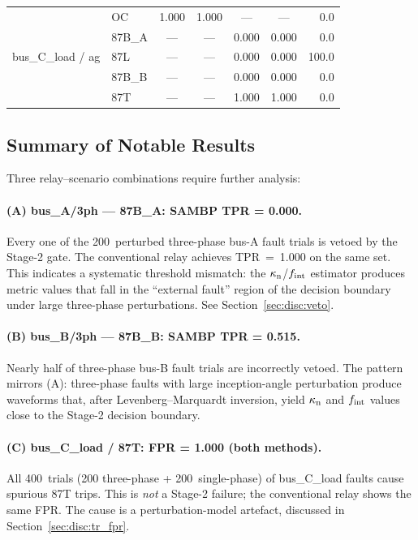 \documentclass[12pt,a4paper]{article}
\newcommand{\kappan}{\kappa_{\rm n}}
\newcommand{\fint}{f_{\rm int}}
\begin{document}
\begin{table}[ht]
\begin{tabular}{llccccr}
\midrule
\multirow{5}{*}{bus\_C\_load / ag}
  & OC      & 1.000 & 1.000 & ---   & ---   & 0.0 \\
  & 87B\_A  & ---   & ---   & 0.000 & 0.000 & 0.0 \\
  & 87L     & ---   & ---   & 0.000 & 0.000 & 100.0 \\
  & 87B\_B  & ---   & ---   & 0.000 & 0.000 & 0.0 \\
  & 87T     & ---   & ---   & \textcolor{warnred}{1.000} & \textcolor{warnred}{1.000} & 0.0 \\
\bottomrule
\end{tabular}
\end{table}

\subsection{Summary of Notable Results}

Three relay--scenario combinations require further analysis:

\paragraph{(A) bus\_A/3ph — 87B\_A: SAMBP TPR = 0.000.}
Every one of the 200~perturbed three-phase bus-A fault trials is vetoed
by the Stage-2 gate.  The conventional relay achieves TPR~=~1.000 on
the same set.  This indicates a systematic threshold mismatch: the
$\kappan$/$\fint$ estimator produces metric values that fall in the
``external fault'' region of the decision boundary under large
three-phase perturbations.  See Section~\ref{sec:disc:veto}.

\paragraph{(B) bus\_B/3ph — 87B\_B: SAMBP TPR = 0.515.}
Nearly half of three-phase bus-B fault trials are incorrectly vetoed.
The pattern mirrors (A): three-phase faults with large inception-angle
perturbation produce waveforms that, after Levenberg--Marquardt
inversion, yield $\kappan$ and $\fint$ values close to the Stage-2
decision boundary.

\paragraph{(C) bus\_C\_load / 87T: FPR = 1.000 (both methods).}
All 400~trials (200 three-phase + 200~single-phase) of bus\_C\_load
faults cause spurious 87T trips.  This is \emph{not} a Stage-2 failure;
the conventional relay shows the same FPR.  The cause is a
perturbation-model artefact, discussed in
Section~\ref{sec:disc:tr_fpr}.
\end{document}

